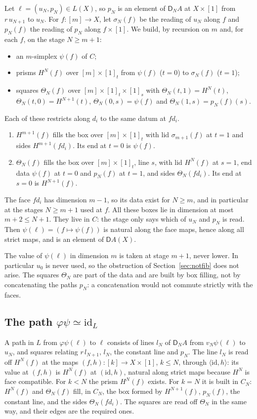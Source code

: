 \documentclass[11pt]{article}
\newcommand{\id}{\mathrm{id}}
\newcommand{\D}{\mathsf{D}}
\theoremstyle{plain}
\theoremstyle{definition}
\theoremstyle{remark}
\begin{document}
Let $\ell=(u_N,p_N)\in L(X)$, so $p_N$ is an element of $\D_NA$ at
$X\times[1]$ from $r\,u_{N+1}$ to $u_N$. For $f:[m]\to X$, let $\sigma_N(f)$
be the reading of $u_N$ along $f$ and $p_N(f)$ the reading of $p_N$ along
$f\times[1]$. We build, by recursion on $m$ and, for each $f$, on the
stage $N\ge m+1$:
\begin{itemize}
\item an $m$-simplex $\psi(f)$ of $C$;
\item prisms $H^N(f)$ over $[m]\times[1]_t$ from $\psi(f)$ ($t=0$) to
  $\sigma_N(f)$ ($t=1$);
\item squares $\Theta_N(f)$ over $[m]\times[1]_t\times[1]_s$ with
  $\Theta_N(t,1)=H^N(t)$, $\Theta_N(t,0)=H^{N+1}(t)$,
  $\Theta_N(0,s)=\psi(f)$ and $\Theta_N(1,s)=p_N(f)(s)$.
\end{itemize}
Each of these restricts along $d_i$ to the same datum at $fd_i$.
\begin{enumerate}
\item $H^{m+1}(f)$ fills the box over $[m]\times[1]_t$ with lid
  $\sigma_{m+1}(f)$ at $t=1$ and sides $H^{m+1}(fd_i)$. Its end at $t=0$ is
  $\psi(f)$.
\item $\Theta_N(f)$ fills the box over $[m]\times[1]_t$, line $s$, with lid
  $H^N(f)$ at $s=1$, end data $\psi(f)$ at $t=0$ and $p_N(f)$ at $t=1$, and
  sides $\Theta_N(fd_i)$. Its end at $s=0$ is $H^{N+1}(f)$.
\end{enumerate}
The face $fd_i$ has dimension $m-1$, so its data exist for $N\ge m$, and
in particular at the stages $N\ge m+1$ used at $f$. All these boxes lie in
dimension at most $m+2\le N+1$. They live in $C$: the stage only says which
of $u_N$ and $p_N$ is read. Then $\psi(\ell)=(f\mapsto\psi(f))$ is natural
along the face maps, hence along all strict maps, and is an element of
$\D A(X)$.

The value of $\psi(\ell)$ in dimension $m$ is taken at stage $m+1$, never
lower. In particular $u_0$ is never used, so the obstruction of
Section~\ref{sec:notfib} does not arise. The squares $\Theta_N$ are part of
the data and are built by box filling, not by concatenating the paths
$p_N$: a concatenation would not commute strictly with the faces.

\subsection{The path $\varphi\psi\simeq\id_L$}

A path in $L$ from $\varphi\psi(\ell)$ to $\ell$ consists of lines $l_N$ of
$\D_NA$ from $v_N\psi(\ell)$ to $u_N$, and squares relating $r\,l_{N+1}$,
$l_N$, the constant line and $p_N$. The line $l_N$ is read off $H^N(f)$ at
the maps $(f,h):[k]\to X\times[1]$, $k\le N$, through $\langle\id,h\rangle$:
its value at $(f,h)$ is $H^N(f)$ at $(\id,h)$, natural along strict maps
because $H^N$ is face compatible. For $k<N$ the prism
$H^N(f)$ exists. For $k=N$ it is built in $C_N$: $H^N(f)$ and
$\Theta_N(f)$ fill, in $C_N$, the box formed by $H^{N+1}(f)$, $p_N(f)$, the
constant line, and the sides $\Theta_N(fd_i)$. The squares are read off
$\Theta_N$ in the same way, and their edges are the required ones.
\end{document}
